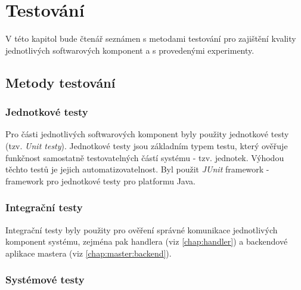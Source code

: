

\chapter{Testování}\label{chap:test}
V této kapitol bude čtenář seznámen s metodami testování pro zajištění kvality jednotlivých softwarových komponent a s provedenými experimenty.

\section{Metody testování}
\subsection{Jednotkové testy}
Pro části jednotlivých softwarových komponent byly použity jednotkové testy \cite{testing_evans} (tzv. \textit{Unit testy}). Jednotkové testy jsou základním typem testu, který ověřuje funkčnost samostatně testovatelných částí systému - tzv. jednotek. Výhodou těchto testů je jejich automatizovatelnost. Byl použit \textit{JUnit} framework - framework pro jednotkové testy pro platformu Java. 

\subsection{Integrační testy}
Integrační testy byly použity pro ověření správné komunikace jednotlivých komponent systému, zejména pak handlera (viz \ref{chap:handler}) a backendové aplikace mastera (viz \ref{chap:master:backend}).

\subsection{Systémové testy}

